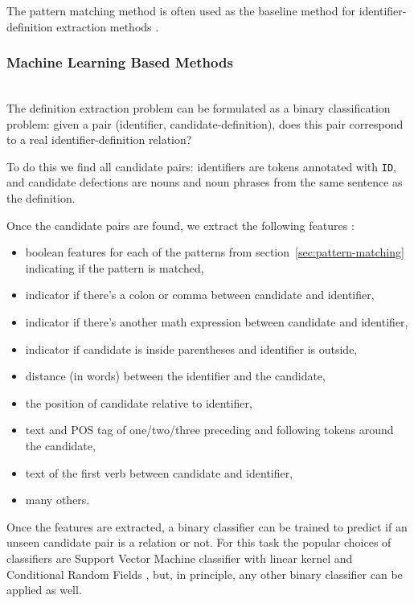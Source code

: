 The pattern matching method is often used as the baseline method
for identifier-definition extraction methods \cite{kristianto2012extracting}
\cite{kristianto2014extracting} \cite{pagael2014mlp}.


\subsubsection{Machine Learning Based Methods}

\ \\

The definition extraction problem can be formulated as a binary classification
problem: given a pair (identifier, candidate-definition), does this pair
correspond to a real identifier-definition relation?

To do this we find all candidate pairs: identifiers are tokens
annotated with \texttt{ID}, and candidate defections are nouns and
noun phrases from the same sentence as the definition.

Once the candidate pairs are found, we extract the following features
\cite{yokoi2011contextual} \cite{kristianto2014extracting}:


\begin{itemize}
\itemsep1pt\parskip0pt
  \item boolean features for each of the patterns from
    section~\ref{sec:pattern-matching} indicating if the pattern is matched,
  \item indicator if there's a colon or comma between candidate and identifier,
  \item indicator if there's another math expression between candidate and identifier,
  \item indicator if candidate is inside parentheses and identifier is outside,
  \item distance (in words) between the identifier and the candidate,
  \item the position of candidate relative to identifier,
  \item text and POS tag of one/two/three preceding and following tokens around the candidate,
  \item text of the first verb between candidate and identifier,
  \item many others.
\end{itemize}

Once the features are extracted, a binary classifier can be trained to predict
if an unseen candidate pair is a relation or not.
For this task the popular choices of classifiers are Support Vector Machine
classifier with linear kernel \cite{kristianto2014extracting} \cite{yokoi2011contextual}
and Conditional Random Fields \cite{kristianto2014extracting},
but, in principle, any other binary classifier can be applied
as well.


